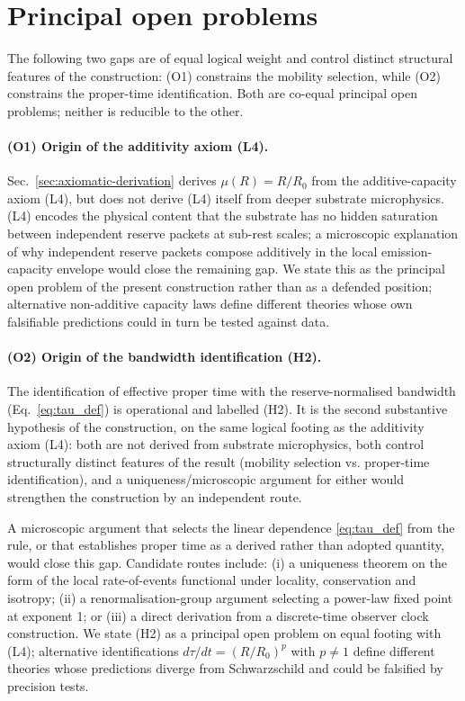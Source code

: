 \documentclass[11pt,a4paper]{article}
\begin{document}
\section{Principal open problems}
\label{sec:open}

The following two gaps are of equal logical weight and control
distinct structural features of the construction: (O1)
constrains the mobility selection, while (O2) constrains the
proper-time identification. Both are co-equal principal open
problems; neither is reducible to the other.

\paragraph{(O1) Origin of the additivity axiom (L4).}
Sec.~\ref{sec:axiomatic-derivation} derives $\mu(R) = R/R_0$
from the additive-capacity axiom (L4), but does not derive (L4)
itself from deeper substrate microphysics. (L4) encodes the
physical content that the substrate has no hidden saturation
between independent reserve packets at sub-rest scales; a
microscopic explanation of why independent reserve packets
compose additively in the local emission-capacity envelope
would close the remaining gap. We state this as the principal
open problem of the present construction rather than as a
defended position; alternative non-additive capacity laws
define different theories whose own falsifiable predictions
could in turn be tested against data.

\paragraph{(O2) Origin of the bandwidth identification (H2).}
The identification of effective proper time with the
reserve-normalised bandwidth (Eq.~\eqref{eq:tau_def}) is
operational and labelled (H2). It is the second substantive
hypothesis of the construction, on the same logical footing as
the additivity axiom (L4): both are not derived from substrate
microphysics, both control structurally distinct features of
the result (mobility selection vs. proper-time identification),
and a uniqueness/microscopic argument for either would
strengthen the construction by an independent route.

A microscopic argument that selects the linear dependence
\eqref{eq:tau_def} from the rule, or that establishes proper
time as a derived rather than adopted quantity, would close
this gap. Candidate routes include: (i) a uniqueness theorem
on the form of the local rate-of-events functional under
locality, conservation and isotropy; (ii) a renormalisation-group
argument selecting a power-law fixed point at exponent 1; or
(iii) a direct derivation from a discrete-time observer
clock construction. We state (H2) as a principal open problem
on equal footing with (L4); alternative identifications
$d\tau/dt = (R/R_0)^p$ with $p \ne 1$ define different theories
whose predictions diverge from Schwarzschild and could be
falsified by precision tests.
\end{document}
